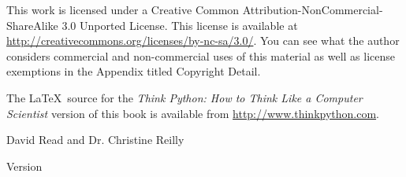 \begin{latexonly}
{This work is licensed under a 
Creative Common
Attribution-NonCommercial-ShareAlike 3.0 Unported License.
This license is 
available at
\url{http://creativecommons.org/licenses/by-nc-sa/3.0/}.  You can 
see what the author considers commercial and non-commercial
uses of this material as well as license exemptions 
in the Appendix titled Copyright Detail.

The \LaTeX\ source for the 
\emph{Think Python: How to Think Like
a Computer Scientist}
version of this book is available from
\url{http://www.thinkpython.com}.

\vspace{0.2in}

} %

\end{latexonly}





{\Large \thetitle}

{\large David Read and Dr. Christine Reilly}

Version \theversion

\setcounter{chapter}{0}

